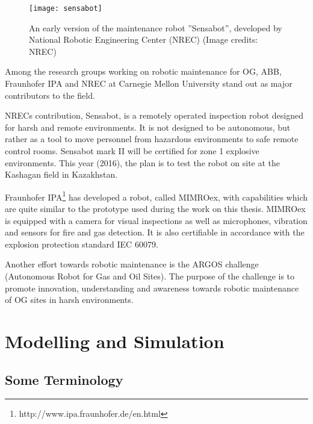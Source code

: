 \begin{wrapfigure}{l}{0.45\textwidth}
	\begin{center}
		\texttt{[image: sensabot]}
	\end{center}
	
	\caption{An early version of the maintenance robot ''Sensabot'', developed by National Robotic Engineering Center (NREC) (Image credits: NREC)}
\end{wrapfigure} 

Among the research groups working on robotic maintenance for \ac{OG}, ABB, \ac{Fraunhofer IPA} and NREC  at  Carnegie
Mellon University stand out as major contributors to the field. 

NRECs contribution, Sensabot, is a remotely operated inspection robot designed for harsh and remote environments\cite{deploymentsensabot}. It is not designed to be autonomous, but rather as a tool to move personnel from hazardous environments to safe remote control rooms. Sensabot mark II will be certified for zone 1 explosive environments. This year (2016), the plan is to test the robot on site at the Kashagan field in Kazakhstan\cite{peerless2016robot}.

\ac{Fraunhofer IPA}\footnote{http://www.ipa.fraunhofer.de/en.html} has developed a robot, called \ac{MIMROex}, with capabilities which are quite similar to the prototype used during the work on this thesis. \ac{MIMROex} is equipped with a camera for visual inspections as well as microphones, vibration and sensors for fire and gas detection. It is also certifiable in accordance with the explosion protection standard IEC 60079\cite{MIMROex}. 

Another effort towards robotic maintenance is the ARGOS challenge (Autonomous Robot for Gas and Oil Sites). The purpose of the challenge is to promote innovation, understanding and awareness towards robotic maintenance of \ac{OG} sites in harsh environments\cite{ARGOS}.

\section{Modelling and Simulation}

\subsection{Some Terminology}

